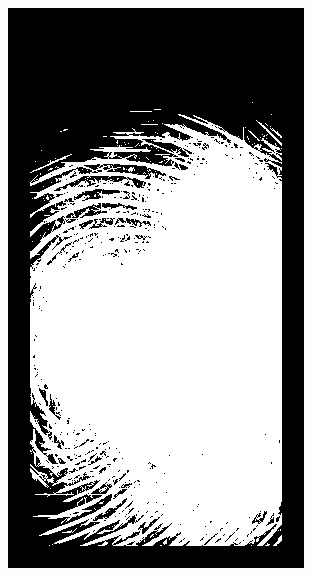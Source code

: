 \documentclass{beamer}
\begin{document}
{\begin{figure}[!ht]
\begin{subfigure}[ht]{0.15\textwidth}
            \includegraphics[width=\textwidth]{fingerprints/2002Db2a/1_2_mask.jpg}
        \end{subfigure}
        \qquad
        \begin{subfigure}[ht]{0.15\textwidth}

\end{subfigure}
\end{figure}}
\end{document}
